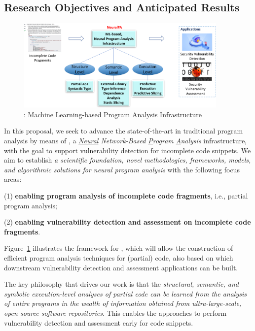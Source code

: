 \subsection{Research Objectives and Anticipated Results}

\begin{figure}[t]
    \centering
    \includegraphics[width=0.92\textwidth]{figures/neuralPA-1.png}
    \caption{{\tool}: Machine Learning-based Program Analysis Infrastructure}
    \label{fig:arch}
\end{figure}


In this proposal, we seek to advance the state-of-the-art in traditional program analysis by means of {\tool}, a {\em \underline{Neural} Network-Based \underline{P}rogram \underline{A}nalysis} infrastructure, with the goal to support vulnerability detection for incomplete code snippets. We aim to establish {\em a scientific foundation, novel methodologies, frameworks, models, and algorithmic solutions for neural program analysis} with the following focus areas:

(1) {\bf enabling program analysis of incomplete code fragments}, i.e., partial program analysis;


(2) {\bf enabling vulnerability detection and assessment on incomplete code fragments}.

\noindent Figure~\ref{fig:arch} illustrates the framework for {\tool},
which will allow the construction of efficient program analysis
techniques for (partial) code, also based on which downstream vulnerability detection and assessment applications can be built.

The key philosophy that drives our work is that the {\em structural,
  semantic, and symbolic execution-level analyses of partial code can
  be learned from the analysis of entire programs in the wealth of
  information obtained from ultra-large-scale, open-source software
  repositories}. This enables the approaches to perform vulnerability
 detection and assessment early for code snippets.


